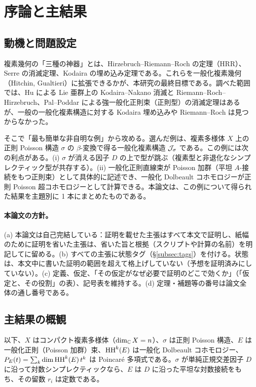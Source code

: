 \section{序論と主結果}\label{sec:intro}
\subsection{動機と問題設定}
複素幾何の「三種の神器」とは、Hirzebruch--Riemann--Roch の定理（HRR）、Serre の消滅定理、Kodaira の埋め込み定理である。これらを一般化複素幾何（Hitchin, Gualtieri）に拡張できるかが、本研究の最終目標である。調べた範囲では、Hu \cite{Hu1,Hu2} による Lie 亜群上の Kodaira--Nakano 消滅と Riemann--Roch--Hirzebruch、Pal--Poddar \cite{PP} による強一般化正則束（正則型）の消滅定理はあるが、一般の一般化複素構造に対する Kodaira 埋め込みや Riemann--Roch は見つからなかった\tC。

そこで「最も簡単な非自明な例」から攻める。選んだ例は、複素多様体 $X$ 上の正則 Poisson 構造 $\sigma$ の $\beta$-変換で得る一般化複素構造 $\mathcal J_\sigma$ である。この例には次の利点がある。(i) $\sigma$ が消える因子 $D$ の上で型が跳ぶ（複素型と非退化なシンプレクティック型が共存する）。(ii) 一般化正則直線束が Poisson 加群（平坦 $A$-接続をもつ正則束）として具体的に記述でき、一般化 Dolbeault コホモロジーが正則 Poisson 超コホモロジーとして計算できる。本論文は、この例について得られた結果を主題別に 1 本にまとめたものである。

\paragraph{本論文の方針。}
(a) 本論文は自己完結している：証明を載せた主張はすべて本文で証明し、紙幅のために証明を省いた主張は、省いた旨と根拠（スクリプトや計算の名前）を明記して\tV に留める。(b) すべての主張に状態タグ（\S\ref{subsec:tags}）を付ける。状態は、本文中に書いた証明の範囲を超えて格上げしていない（予想を証明済みにしていない）。(c) 定義、仮定、「その仮定がなぜ必要で証明のどこで効くか」（「仮定と、その役割」の表）、記号表を維持する。(d) 定理・補題等の番号は論文全体の通し番号である。

\subsection{主結果の概観}
以下、$X$ はコンパクト複素多様体（$\dim_\mathbb C X=n$）、$\sigma$ は正則 Poisson 構造、$E$ は一般化正則（Poisson 加群）束、$\mathrm{HH}^k(E)$ は一般化 Dolbeault コホモロジー、$P_E(t)=\sum_k\dim\mathrm{HH}^k(E)\,t^k$ は Poincar\'e 多項式である。$\sigma$ が単純正規交差因子 $D$ に沿って対数シンプレクティックなら、$E$ は $D$ に沿った平坦な対数接続をもち、その留数 $r_i$ は定数である。

